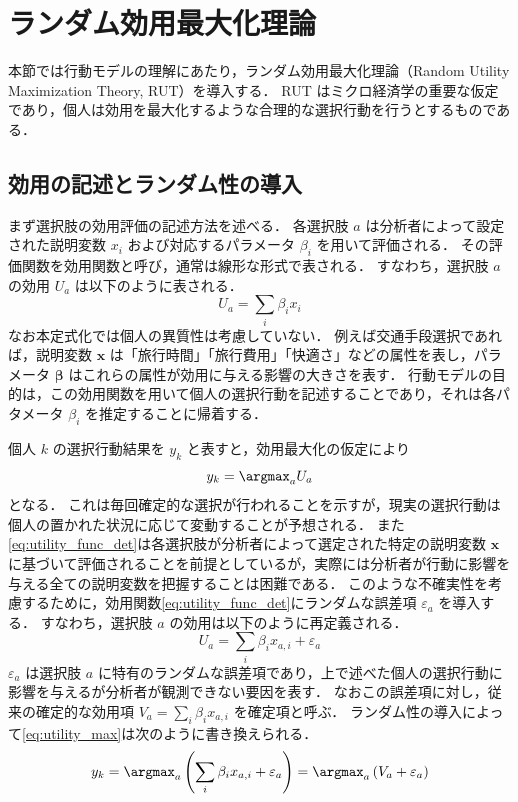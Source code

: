 
\section{ランダム効用最大化理論}\label{sec:abms}

本節では行動モデルの理解にあたり，ランダム効用最大化理論（Random Utility Maximization Theory, RUT）を導入する．
RUT はミクロ経済学の重要な仮定であり，個人は効用を最大化するような合理的な選択行動を行うとするものである．

\subsection{効用の記述とランダム性の導入}
まず選択肢の効用評価の記述方法を述べる．
各選択肢 $a$ は分析者によって設定された説明変数 $x_{i}$ および対応するパラメータ $\beta_{i}$ を用いて評価される．
その評価関数を効用関数と呼び，通常は線形な形式で表される．
すなわち，選択肢 $a$ の効用 $U_{a}$ は以下のように表される．
\begin{equation}\label{eq:utility_func_det}
U_{a} = \sum_{i} \beta_{i} x_{i}
\end{equation}
なお本定式化では個人の異質性は考慮していない．
例えば交通手段選択であれば，説明変数 $\bm{x}$ は「旅行時間」「旅行費用」「快適さ」などの属性を表し，パラメータ $\bm{\beta}$ はこれらの属性が効用に与える影響の大きさを表す．
行動モデルの目的は，この効用関数を用いて個人の選択行動を記述することであり，それは各パタメータ $\beta_{i}$ を推定することに帰着する．

個人 $k$ の選択行動結果を $y_k$ と表すと，効用最大化の仮定により
\begin{equation}\label{eq:utility_max}
y_k = \argmax_{a} U_{a}
\end{equation}
となる．
これは毎回確定的な選択が行われることを示すが，現実の選択行動は個人の置かれた状況に応じて変動することが予想される．
また\eqref{eq:utility_func_det}は各選択肢が分析者によって選定された特定の説明変数 $\bm{x}$ に基づいて評価されることを前提としているが，実際には分析者が行動に影響を与える全ての説明変数を把握することは困難である．
このような不確実性を考慮するために，効用関数\eqref{eq:utility_func_det}にランダムな誤差項 $\varepsilon_a$ を導入する．
すなわち，選択肢 $a$ の効用は以下のように再定義される．
\begin{equation}\label{eq:utility_func_random}
U_{a} = \sum_{i} \beta_{i} x_{a, i} + \varepsilon_a
\end{equation}
$\varepsilon_a$ は選択肢 $a$ に特有のランダムな誤差項であり，上で述べた個人の選択行動に影響を与えるが分析者が観測できない要因を表す．
なおこの誤差項に対し，従来の確定的な効用項 $V_a = \sum_i \beta_i x_{a, i}$ を確定項と呼ぶ．
ランダム性の導入によって\eqref{eq:utility_max}は次のように書き換えられる．
\begin{equation}\label{eq:utility_max_random}
y_k = \argmax_{a} \left( \sum_{i} \beta_{i} x_{a, i} + \varepsilon_a \right) = \argmax_{a} \left( V_a + \varepsilon_a \right)
\end{equation}

